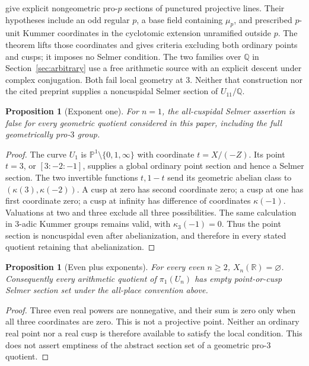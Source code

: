 \documentclass[11pt]{article}
\newcommand{\Q}{\mathbb Q}
\numberwithin{equation}{section}
\newtheorem{proposition}[theorem]{Proposition}
\theoremstyle{definition}
\begin{document}
\citet[Theorem~A, pp.~2--3; Theorem~2.4 and Corollary~2.5,
pp.~9--11]{HoshiTsujimura2021} give explicit nongeometric pro-$p$
sections of punctured projective lines. Their hypotheses include
an odd regular $p$, a base field containing $\mu_p$, and prescribed
$p$-unit Kummer coordinates in the cyclotomic extension unramified
outside $p$. The theorem lifts those coordinates and gives criteria
excluding both ordinary points and cusps; it imposes no Selmer
condition. The two families over $\Q$ in Section~\ref{sec:arbitrary}
use a free arithmetic source with an explicit descent under complex
conjugation. Both fail local geometry at $3$. Neither that
construction nor the cited preprint supplies a noncuspidal Selmer
section of $U_{11}/\Q$.

\begin{proposition}[Exponent one]\label{prop:one}
For $n=1$, the all-cuspidal Selmer assertion is false for every
geometric quotient considered in this paper, including the full
geometrically pro-$3$ group.
\end{proposition}
\begin{proof}
The curve $U_1$ is $\mathbb P^1\setminus\{0,1,\infty\}$ with
coordinate $t=X/(-Z)$. Its point $t=3$, or $[3:-2:-1]$, supplies
a global ordinary point section and hence a Selmer section. The
two invertible functions $t,1-t$ send its geometric abelian class
to $(\kappa(3),\kappa(-2))$. A cusp at zero has second coordinate
zero; a cusp at one has first coordinate zero; a cusp at infinity
has difference of coordinates $\kappa(-1)$. Valuations at two and
three exclude all three possibilities. The same calculation in
$3$-adic Kummer groups remains valid, with $\kappa_3(-1)=0$.
Thus the point section is noncuspidal even after abelianization,
and therefore in every stated quotient retaining that abelianization.
\end{proof}

\begin{proposition}[Even plus exponents]\label{prop:even-plus}
For every even $n\geq2$, $X_n(\mathbb R)=\varnothing$. Consequently
every arithmetic quotient of $\pi_1(U_n)$ has empty point-or-cusp
Selmer section set under the all-place convention above.
\end{proposition}
\begin{proof}
Three even real powers are nonnegative, and their sum is zero only
when all three coordinates are zero. This is not a projective point.
Neither an ordinary real point nor a real cusp is therefore available
to satisfy the local condition. This does not assert emptiness of
the abstract section set of a geometric pro-$3$ quotient.
\end{proof}
\end{document}
